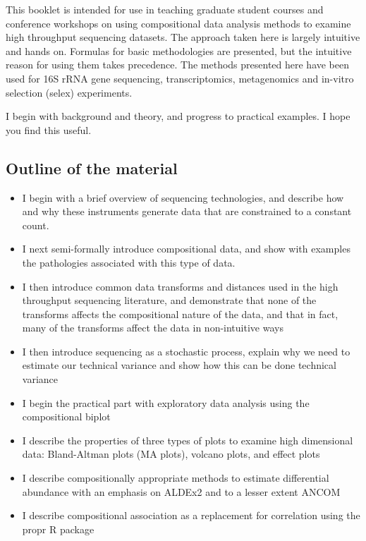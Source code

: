 \documentclass[twocolumn]{article}
\providecommand{\tightlist}{%
  \setlength{\itemsep}{0pt}\setlength{\parskip}{0pt}}
\begin{document}
This booklet is intended for use in teaching graduate student courses
and conference workshops on using compositional data analysis methods to
examine high throughput sequencing datasets. The approach taken here is
largely intuitive and hands on. Formulas for basic methodologies are
presented, but the intuitive reason for using them takes precedence. The
methods presented here have been used for 16S rRNA gene sequencing,
transcriptomics, metagenomics and in-vitro selection (selex)
experiments.

I begin with background and theory, and progress to practical examples.
I hope you find this useful.

\subsection{Outline of the material}\label{outline-of-the-material}

\begin{itemize}
\tightlist
\item
  I begin with a brief overview of sequencing technologies, and describe
  how and why these instruments generate data that are constrained to a
  constant count.
\item
  I next semi-formally introduce compositional data, and show with
  examples the pathologies associated with this type of data.
\item
  I then introduce common data transforms and distances used in the high
  throughput sequencing literature, and demonstrate that none of the
  transforms affects the compositional nature of the data, and that in
  fact, many of the transforms affect the data in non-intuitive ways
\item
  I then introduce sequencing as a stochastic process, explain why we
  need to estimate our technical variance and show how this can be done
  technical variance
\item
  I begin the practical part with exploratory data analysis using the
  compositional biplot
\item
  I describe the properties of three types of plots to examine high
  dimensional data: Bland-Altman plots (MA plots), volcano plots, and
  effect plots
\item
  I describe compositionally appropriate methods to estimate
  differential abundance with an emphasis on ALDEx2 and to a lesser
  extent ANCOM
\item
  I describe compositional association as a replacement for correlation
  using the propr R package \clearpage
\end{itemize}
\end{document}

